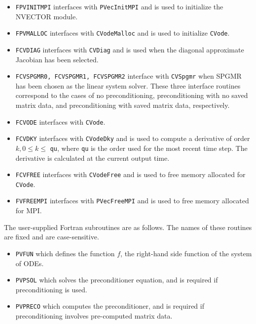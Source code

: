 \begin{itemize}
\item  {\tt FPVINITMPI} interfaces with {\tt PVecInitMPI} and is used to
initialize the NVECTOR module.

\item  {\tt FPVMALLOC} interfaces with {\tt CVodeMalloc} and is used to
initialize {\tt CVode}.

\item  {\tt FCVDIAG} interfaces with {\tt CVDiag} and is used when the
diagonal approximate Jacobian has been selected.

\item  {\tt FCVSPGMR0, FCVSPGMR1, FCVSPGMR2} interface with {\tt CVSpgmr}
when SPGMR has been chosen as the linear system solver. These three
interface routines correspond to the cases of no preconditioning,
preconditioning with no saved matrix data, and preconditioning with
saved matrix data, respectively.

\item  {\tt FCVODE} interfaces with {\tt CVode}.

\item  {\tt FCVDKY} interfaces with {\tt CVodeDky} and is used to compute
a derivative of order $k, 0 \leq k\leq$ {\tt qu}, where {\tt qu} is the
order used for the most recent time step. The derivative is calculated at
the current output time.

\item  {\tt FCVFREE} interfaces with {\tt CVodeFree} and is used to free
memory allocated for {\tt CVode}.

\item  {\tt FVFREEMPI} interfaces with {\tt PVecFreeMPI} and is used to free
memory allocated for MPI.
\end{itemize}

The user-supplied Fortran subroutines are as follows.  The names of
these routines are fixed and are case-sensitive.

\begin{itemize}
\item  {\tt PVFUN} which defines the function $f$, the right-hand side
function of the system of ODEs.

\item  {\tt PVPSOL} which solves the preconditioner equation, and is required
if preconditioning is used.

\item  {\tt PVPRECO} which computes the preconditioner, and is required if
preconditioning involves pre-computed matrix data.

\end{itemize}

